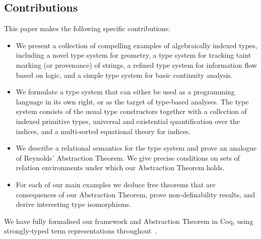 
\subsection{Contributions}
\label{sec:contributions}

This paper makes the following specific contributions:
\begin{itemize}
\item 
We present a collection of compelling examples of algebraically
indexed types, including a novel type system for geometry, a type
system for tracking taint marking (or provenance) of strings, a
refined type system for information flow based on logic, and a simple
type system for basic continuity analysis.
\item 
We formulate a type system that can either be used as a programming
language in its own right, or as the target of type-based
analyses. The type system consists of the usual type constructors
together with a collection of indexed primitive types, universal and
existential quantification over the indices, and a multi-sorted
equational theory for indices.
\item
We describe a relational semantics for the type system and prove an
analogue of Reynolds' Abstraction Theorem. We give precise conditions
on sets of relation environments under which our Abstraction Theorem
holds.
\item
For each of our main examples we deduce free theorems that are
consequences of our Abstraction Theorem, prove non-definability
results, and derive interesting type isomorphisms.
\end{itemize}
We have fully formalised our framework and Abstraction Theorem in Coq,
using strongly-typed term representations
throughout~\cite{TypedSyntax}.

